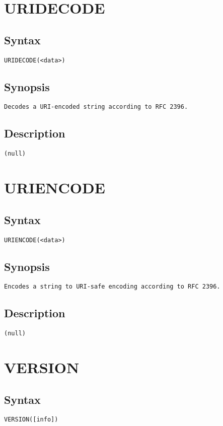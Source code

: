 \section{URIDECODE}
\subsection{Syntax}
\begin{verbatim}
URIDECODE(<data>)
\end{verbatim}
\subsection{Synopsis}
\begin{verbatim}
Decodes a URI-encoded string according to RFC 2396.
\end{verbatim}
\subsection{Description}
\begin{verbatim}
(null)
\end{verbatim}


\section{URIENCODE}
\subsection{Syntax}
\begin{verbatim}
URIENCODE(<data>)
\end{verbatim}
\subsection{Synopsis}
\begin{verbatim}
Encodes a string to URI-safe encoding according to RFC 2396.
\end{verbatim}
\subsection{Description}
\begin{verbatim}
(null)
\end{verbatim}


\section{VERSION}
\subsection{Syntax}
\begin{verbatim}
VERSION([info])
\end{verbatim}
